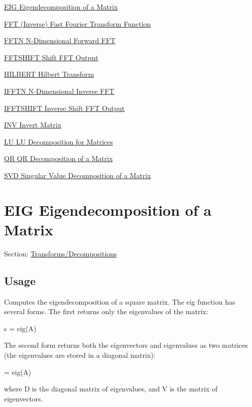 
\begin{DoxyItemize}
\item \hyperlink{transforms_eig}{E\-I\-G Eigendecomposition of a Matrix}  
\item \hyperlink{transforms_fft}{F\-F\-T (Inverse) Fast Fourier Transform Function}  
\item \hyperlink{transforms_fftn}{F\-F\-T\-N N-\/\-Dimensional Forward F\-F\-T }  
\item \hyperlink{transforms_fftshift}{F\-F\-T\-S\-H\-I\-F\-T Shift F\-F\-T Output}  
\item \hyperlink{transforms_hilbert}{H\-I\-L\-B\-E\-R\-T Hilbert Transform}  
\item \hyperlink{transforms_ifftn}{I\-F\-F\-T\-N N-\/\-Dimensional Inverse F\-F\-T }  
\item \hyperlink{transforms_ifftshift}{I\-F\-F\-T\-S\-H\-I\-F\-T Inverse Shift F\-F\-T Output}  
\item \hyperlink{transforms_inv}{I\-N\-V Invert Matrix}  
\item \hyperlink{transforms_lu}{L\-U L\-U Decomposition for Matrices}  
\item \hyperlink{transforms_qr}{Q\-R Q\-R Decomposition of a Matrix}  
\item \hyperlink{transforms_svd}{S\-V\-D Singular Value Decomposition of a Matrix}  
\end{DoxyItemize}\hypertarget{transforms_eig}{}\section{E\-I\-G Eigendecomposition of a Matrix}\label{transforms_eig}
Section\-: \hyperlink{sec_transforms}{Transforms/\-Decompositions} \hypertarget{vtkwidgets_vtkxyplotwidget_Usage}{}\subsection{Usage}\label{vtkwidgets_vtkxyplotwidget_Usage}
Computes the eigendecomposition of a square matrix. The {\ttfamily eig} function has several forms. The first returns only the eigenvalues of the matrix\-: \begin{DoxyVerb}  s = eig(A)
\end{DoxyVerb}
 The second form returns both the eigenvectors and eigenvalues as two matrices (the eigenvalues are stored in a diagonal matrix)\-: \begin{DoxyVerb}  [V,D] = eig(A)
\end{DoxyVerb}
 where {\ttfamily D} is the diagonal matrix of eigenvalues, and {\ttfamily V} is the matrix of eigenvectors.

